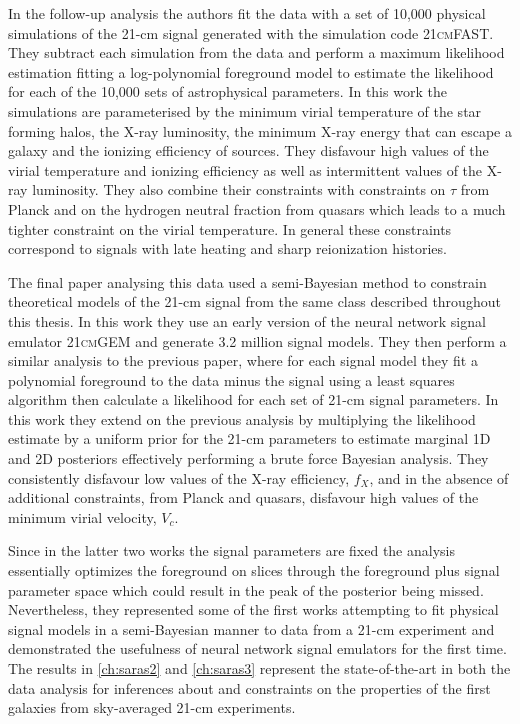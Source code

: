 In the follow-up analysis \cite{Monsalve_EDGES_HB_2_2018} the authors fit the data with a set of 10,000 physical simulations of the 21-cm signal generated with the simulation code \textsc{21cmFAST}. They subtract each simulation from the data and perform a maximum likelihood estimation fitting a log-polynomial foreground model to estimate the likelihood for each of the 10,000 sets of astrophysical parameters. %
In this work the simulations are parameterised by the minimum virial temperature of the star forming halos, the X-ray luminosity, the minimum X-ray energy that can escape a galaxy and the ionizing efficiency of sources. They disfavour high values of the virial temperature and ionizing efficiency as well as intermittent values of the X-ray luminosity. They also combine their constraints with constraints on $\tau$ from Planck and on the hydrogen neutral fraction from quasars which leads to a much tighter constraint on the virial temperature. In general these constraints correspond to signals with late heating and sharp reionization histories.

The final paper analysing this data \cite{Monsalve_EDGES_HB_3_2019} used a semi-Bayesian method to constrain theoretical models of the 21-cm signal from the same class described throughout this thesis. In this work they use an early version of the neural network signal emulator \textsc{21cmGEM} and generate 3.2 million signal models. They then perform a similar analysis to the previous paper, where for each signal model they fit a polynomial foreground to the data minus the signal using a least squares algorithm then calculate a likelihood for each set of 21-cm signal parameters. In this work they extend on the previous analysis by multiplying the likelihood estimate by a uniform prior for the 21-cm parameters to estimate marginal 1D and 2D posteriors effectively performing a brute force Bayesian analysis. They consistently disfavour low values of the X-ray efficiency, $f_X$, and in the absence of additional constraints, from Planck and quasars, disfavour high values of the minimum virial velocity, $V_c$.

Since in the latter two works the signal parameters are fixed the analysis essentially optimizes the foreground on slices through the foreground plus signal parameter space which could result in the peak of the posterior being missed. Nevertheless, they represented some of the first works attempting to fit physical signal models in a semi-Bayesian manner to data from a 21-cm experiment and demonstrated the usefulness of neural network signal emulators for the first time. The results in \cref{ch:saras2} and \cref{ch:saras3} represent the state-of-the-art in both the data analysis for inferences about and constraints on the properties of the first galaxies from sky-averaged 21-cm experiments.

